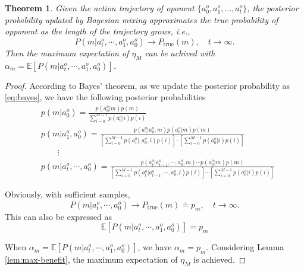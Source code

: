 \documentclass{article}
\newtheorem{theorem}{Theorem}
\begin{document}
\begin{theorem}
Given the action trajectory of oponent $\{a^o_0,a^o_1,\ldots,a^o_t\}$, the posterior probability updated by Bayesian mixing approximates the true probability of opponent as the length of the trajectory grows, \textit{i.e.},
\begin{equation*}
    P(m|a^o_t,\cdots,a^o_1,a^o_0)\to P_{\operatorname{true}}(m), \quad t\to \infty.
\end{equation*}
Then the maximum expectation of $\eta_M$ can be achived with $\alpha_m=\mathbb{E}[P(m|a^o_t,\cdots,a^o_1,a^o_0)]$.
\end{theorem}

\begin{proof}
According to Bayes' theorem, as we update the posterior probability as \eqref{eq:bayes}, we have the following posterior probabilities
\begin{align*}
&p(m|a^o_0) = \frac{p(a^o_0|m)p(m)}{\sum_{i=0}^{M-1}p(a^o_0|i)p(i)}\\
&p(m|a^o_1, a^o_0) = \frac{p(a^o_1|a^o_0,m)p(a^o_0|m)p(m)}{\left[\sum_{i=0}^{M-1}p(a^o_1|,a^o_0,i)p(i)\right]\cdot\left[\sum_{i=0}^{M-1}p(a^o_0|i)p(i)\right]}\\
&\qquad\vdots\\
&p(m|a^o_t, \cdots, a^o_0) = \frac{p(a^o_t|a^o_{t-1},\cdots,a^o_{0},m)\cdots p(a^o_0|m)p(m)}{\left[\sum_{i=0}^{M-1}p(a^o_{t}|a^o_{t-1},\cdots,a^o_0,i)p(i)\right]\cdots\left[\sum_{i=0}^{M-1}p(a^o_0|i)p(i)\right]}
\end{align*}

Obviously, with sufficient samples,
\begin{equation*}
    P(m|a^o_t,\cdots,a^o_0)\to P_{\operatorname{true}}(m)\doteq p_m, \quad t\to \infty.
\end{equation*}
This can also be expressed as
\begin{equation*}
    \mathbb{E}[P(m|a^o_t,\cdots,a^o_1,a^o_0)] = p_m
\end{equation*}

When $\alpha_m=\mathbb{E}[P(m|a^o_t,\cdots,a^o_1,a^o_0)]$, we have $\alpha_m = p_m$. Considering Lemma \ref{lem:max-benefit}, the maximum expectation of $\eta_M$ is achieved.
\end{proof}



\newpage
\end{document}
